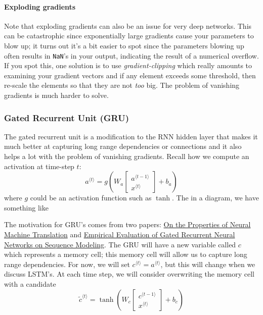\documentclass[12pt]{article}
\begin{document}
\paragraph{Exploding gradients} Note that exploding gradients can also be an issue for very deep networks. This can be catastrophic since exponentially large gradients cause your parameters to blow up; it turns out it's a bit easier to spot since the parameters blowing up often results in \texttt{NaN}'s in your output, indicating the result of a numerical overflow. If you spot this, one solution is to use \emph{gradient-clipping} which really amounts to examining your gradient vectors and if any element exceeds some threshold, then re-scale the elements so that they are not \emph{too} big. The problem of vanishing gradients is much harder to solve.

\subsubsection{Gated Recurrent Unit (GRU)} The gated recurrent unit is a modification to the RNN hidden layer that makes it much better at capturing long range dependencies or connections and it also helps a lot with the problem of vanishing gradients. Recall how we compute an activation at time-step $t$:
\[
a^{\langle t \rangle} = g(W_a \begin{bmatrix} a^{\langle t-1 \rangle} \\ x^{\langle t \rangle} \end{bmatrix} + b_a)
\]
where $g$ could be an activation function such as $\tanh$. The in a diagram, we have something like
\begin{figure}[h]
  \centering
\end{figure}
The motivation for GRU's comes from two papers: \href{https://arxiv.org/pdf/1409.1259.pdf}{On the Properties of Neural Machine Translation} and \href{https://arxiv.org/abs/1412.3555}{Empirical Evaluation of Gated Recurrent Neural Networks on Sequence Modeling}. The GRU will have a new variable called $c$ which represents a memory cell; this memory cell will allow us to capture long range dependencies. For now, we will set $c^{\langle t \rangle} = a^{\langle t \rangle}$, but this will change when we discuss LSTM's. At each time step, we will consider overwriting the memory cell with a candidate \[
\tilde c^{\langle t \rangle} = \tanh\left(W_c \begin{bmatrix} c^{\langle t-1 \rangle}   \\ x^{\langle t \rangle} \end{bmatrix} + b_c \right)
\]
\end{document}
